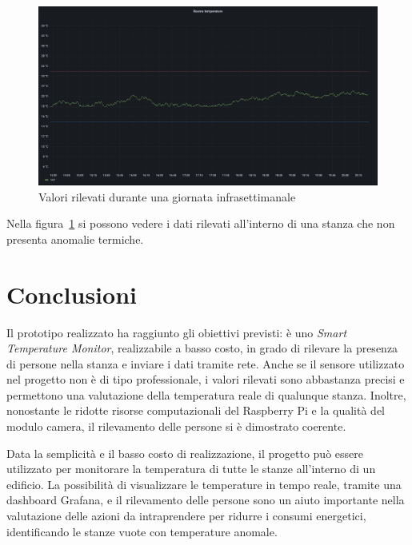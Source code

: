 \documentclass[italian,12pt,a4paper,oneside,final]{report}
\begin{document}
\begin{figure}[h]
	\centering
	\includegraphics[width=1\textwidth]{grafana_room.png}
	\caption{Valori rilevati durante una giornata infrasettimanale}
	\label{fig:grafana_stanza}
\end{figure}

Nella figura~\ref{fig:grafana_stanza} si possono vedere i dati rilevati all'interno di una stanza che non presenta anomalie termiche.

\newpage

\section{Conclusioni}
Il prototipo realizzato ha raggiunto gli obiettivi previsti: è uno \textit{Smart Temperature Monitor}, realizzabile a basso costo, in grado di rilevare la presenza di persone nella stanza e inviare i dati tramite rete.
Anche se il sensore utilizzato nel progetto non è di tipo professionale, i valori rilevati sono abbastanza precisi e permettono una valutazione della temperatura reale di qualunque stanza.
Inoltre, nonostante le ridotte risorse computazionali del Raspberry Pi e la qualità del modulo camera, il rilevamento delle persone si è dimostrato coerente.

Data la semplicità e il basso costo di realizzazione, il progetto può essere utilizzato per monitorare la temperatura di tutte le stanze all'interno di un edificio.
La possibilità di visualizzare le temperature in tempo reale, tramite una dashboard Grafana, e il rilevamento delle persone sono un aiuto importante nella valutazione delle azioni da intraprendere per ridurre i consumi energetici, identificando le stanze vuote con temperature anomale.

\appendices
{}
\end{document}
